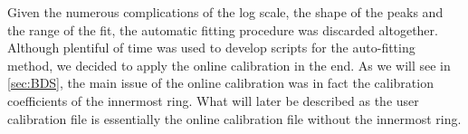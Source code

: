 \documentclass[twoside,english]{uiofysmaster/uiofysmaster}
\let\orgautoref\autoref
\renewcommand{\autoref}
        {%
		 \def\sectionautorefname{Section}%
		 \def\subsectionautorefname{Section}%
		 \def\subsubsectionautorefname{Section}%
		 \def\chapterautorefname{Chapter}%
          \orgautoref}
\begin{document}


Given the numerous complications of the log scale, the shape of the peaks and the range of the fit, the automatic fitting procedure was discarded altogether. 
Although plentiful of time was used to develop scripts for the auto-fitting method, we decided to apply the online calibration in the end.
As we will see in \autoref{sec:BDS}, the main issue of the online calibration was in fact the calibration coefficients of the innermost ring.
What will later be described as the user calibration file is essentially the online calibration file without the innermost ring.
\end{document}
